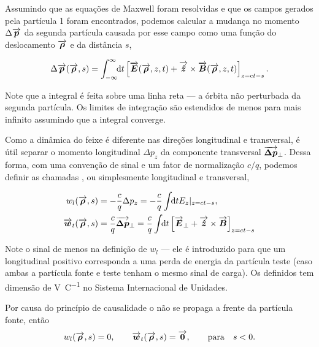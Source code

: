 Assumindo que as equações de Maxwell foram resolvidas e que os campos gerados pela partícula 1 foram encontrados, podemos calcular a mudança no momento $\Delta \vect{p}$ da segunda partícula causada por esse campo como uma função do deslocamento $\vect{\rho}$ e da distância $s$,

\begin{equation}
 \Delta \vect{p}(\vect{\rho},s) = \defint{t}{\left[\vect{E}(\vect{\rho},z,t) + \vect{\hat{z}}\times \vect{B}(\vect{\rho},z,t)\right]_{z=ct-s}}{-\infty}{\infty}.
\end{equation}

Note que a integral é feita sobre uma linha reta --- a órbita não perturbada da segunda partícula. Os limites de integração são estendidos de menos para mais infinito assumindo que a integral converge.

Como a dinâmica do feixe é diferente nas direções longitudinal e transversal, é útil separar o momento longitudinal $\Delta p_z$ da componente transversal $\vect{\Delta p}_\perp$. Dessa forma, com uma convenção de sinal e um fator de normalização $c/q$, podemos definir as chamadas , ou simplesmente  longitudinal e transversal,

\begin{equation}\label{eq:wake_definition}\begin{aligned}
    w_l(\vect{\rho},s) &= -\frac{c}{q} \Delta p_z = -\frac{c}{q} \udefint{t}{E_z|_{z=ct-s}}, \\
    \vect{w}_t(\vect{\rho},s) &= \frac{c}{q} \vect{\Delta p}_\perp = \frac{c}{q} \udefint{t}{\left[\vect{E}_\perp + \vect{\hat{z}}\times \vect{B}\right]_{z=ct-s}}
\end{aligned}\end{equation}

Note o sinal de menos na definição de $w_l$ --- ele é introduzido para que um  longitudinal positivo corresponda a uma perda de energia da partícula teste (caso ambas a partícula fonte e teste tenham o mesmo sinal de carga). Os  definidos tem dimensão de \si{\volt\per\coulomb} no Sistema Internacional de Unidades.

Por causa do princípio de causalidade o  não se propaga a frente da partícula fonte, então
\begin{equation}
    w_l(\vect{\rho},s) = 0, \qquad \vect{w}_t(\vect{\rho},s) = \vect{0}, \qquad \mathrm{para } \quad s < 0.
\end{equation}

